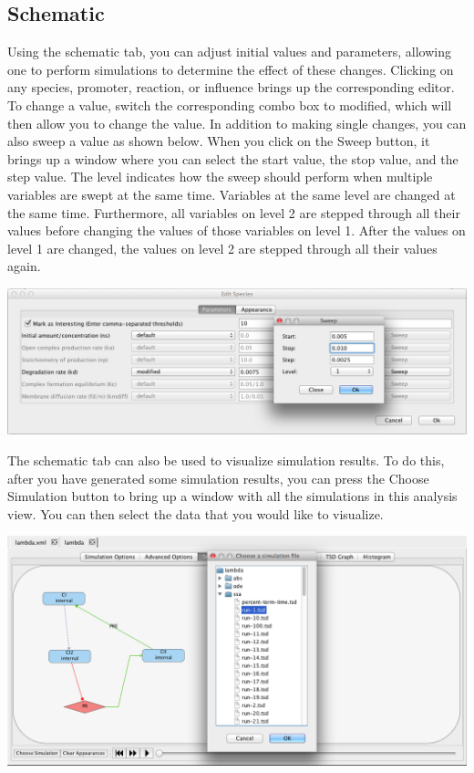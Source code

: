 \documentclass[titlepage,11pt]{article}
\begin{document}
\clearpage

\subsection{\label{AnalysisSchematic}Schematic}

\noindent
Using the schematic tab, you can adjust initial values and parameters, allowing one to perform simulations to determine the effect of these changes.  Clicking on any species, promoter, reaction, or influence brings up the corresponding editor.  To change a value, switch the corresponding combo box to modified, which will then allow you to change the value.  
In addition to making single changes, you can also sweep a value as shown below.  When you click on the Sweep button, it brings up a window where you can select the start value, the stop value, and the step value.  The level indicates how the sweep should perform when multiple variables are swept at the same time.  Variables at the same level are changed at the same time.  Furthermore, all variables on level 2 are stepped through all their values before changing the values of those variables on level 1.  After the values on level 1 are changed, the values on level 2 are stepped through all their values again.  

\begin{center}
\includegraphics[width=160mm]{screenshots/paramEdit}
\end{center}


The schematic tab can also be used to visualize simulation results.  To do this, after you have generated some simulation results, you can press the Choose Simulation button to bring up a window with all the simulations in this analysis view.  You can then select the data that you would like to visualize.

\begin{center}
\includegraphics[width=160mm]{screenshots/chooseSim}
\end{center}
\end{document}
